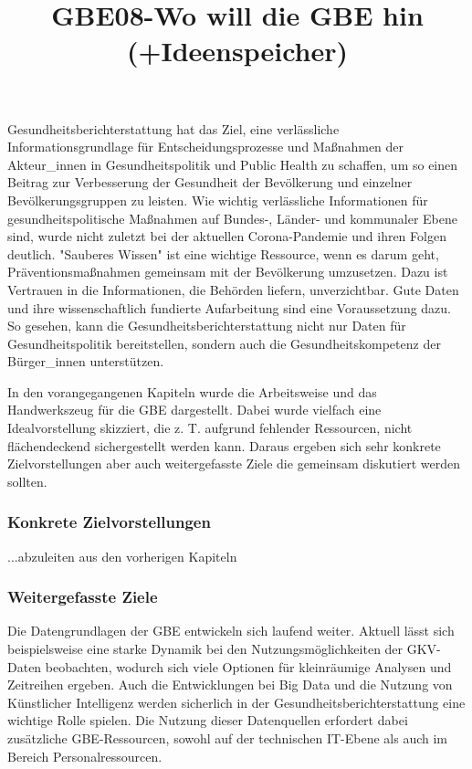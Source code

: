 \documentclass{article}
\begin{document}
\title{GBE08-Wo will die  GBE hin (+Ideenspeicher) }

\maketitle





Gesundheitsberichterstattung hat das Ziel, eine verlässliche Informationsgrundlage für Entscheidungsprozesse und Maßnahmen der Akteur\_innen in Gesundheitspolitik und Public Health zu schaffen, um so einen Beitrag zur Verbesserung der Gesundheit der Bevölkerung und einzelner Bevölkerungsgruppen zu leisten. Wie wichtig verlässliche Informationen für gesundheitspolitische Maßnahmen  auf Bundes-, Länder- und kommunaler Ebene sind, wurde nicht zuletzt bei der aktuellen Corona-Pandemie und ihren Folgen deutlich. "Sauberes Wissen" ist eine wichtige Ressource, wenn es darum geht, Präventionsmaßnahmen gemeinsam mit der Bevölkerung umzusetzen. Dazu ist Vertrauen in die Informationen, die Behörden liefern, unverzichtbar. Gute Daten und ihre wissenschaftlich fundierte Aufarbeitung sind eine Voraussetzung dazu.  So gesehen, kann die Gesundheitsberichterstattung nicht nur Daten für Gesundheitspolitik bereitstellen, sondern auch die Gesundheitskompetenz der Bürger\_innen unterstützen.


In den vorangegangenen Kapiteln wurde die Arbeitsweise und das Handwerkszeug für die GBE dargestellt. Dabei wurde vielfach eine Idealvorstellung skizziert, die z. T. aufgrund fehlender Ressourcen, nicht flächendeckend sichergestellt werden kann.  Daraus ergeben sich sehr konkrete Zielvorstellungen aber auch weitergefasste Ziele die gemeinsam diskutiert werden sollten.


\subsubsection{Konkrete Zielvorstellungen}\label{H667089}



...abzuleiten aus den vorherigen Kapiteln


\subsubsection{Weitergefasste Ziele }\label{H980925}



Die Datengrundlagen der GBE entwickeln sich laufend weiter. Aktuell lässt sich beispielsweise eine starke Dynamik bei den Nutzungsmöglichkeiten der GKV-Daten beobachten, wodurch sich viele Optionen für kleinräumige Analysen und Zeitreihen ergeben. Auch die Entwicklungen bei Big Data und die Nutzung von Künstlicher Intelligenz werden sicherlich in der Gesundheitsberichterstattung eine wichtige Rolle spielen. Die Nutzung dieser Datenquellen erfordert dabei zusätzliche GBE-Ressourcen, sowohl auf der technischen IT-Ebene als auch im Bereich Personalressourcen. 
\end{document}
